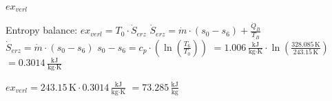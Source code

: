 \( ex_{verl} \)  

Entropy balance:  
\( ex_{verl} = T_0 \cdot \dot{S}_{erz} \)  
\( \dot{S}_{erz} = \dot{m} \cdot (s_0 - s_6) + \frac{\dot{Q}_B}{T_B} \)  
\( \dot{S}_{erz} = \dot{m} \cdot (s_0 - s_6) \)  
\( s_0 - s_6 = c_p \cdot (\ln \left( \frac{T_6}{T_0} \right)) \)  
\( = 1.006 \, \frac{\text{kJ}}{\text{kg·K}} \cdot \ln \left( \frac{328.085 \, \text{K}}{243.15 \, \text{K}} \right) \)  
\( = 0.3014 \, \frac{\text{kJ}}{\text{kg·K}} \)  

\( ex_{verl} = 243.15 \, \text{K} \cdot 0.3014 \, \frac{\text{kJ}}{\text{kg·K}} \)  
\( = 73.285 \, \frac{\text{kJ}}{\text{kg}} \)